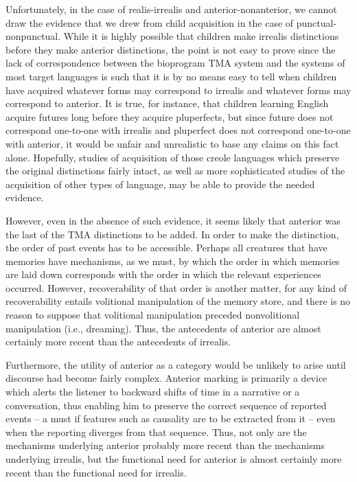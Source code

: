 Unfortunately, in the case of realis-irrealis and anterior-nonanterior, we cannot draw the evidence that we drew from child acquisition in the case of punctual-nonpunctual. While it is highly possible that children make irrealis distinctions before they make anterior distinctions, the point is not easy to prove since the lack of correspondence between the bioprogram TMA system and the systems of most target languages is such that it is by no means easy to tell when children have acquired whatever forms may correspond to irrealis and whatever forms may correspond to anterior. It is true, for instance, that children learning English acquire futures long before they acquire pluperfects, but since future does not correspond one-to-one with irrealis and pluperfect does not correspond one-to-one with anterior, it would be unfair and unrealistic to base any claims on this fact alone. Hopefully, studies of acquisition of those creole languages which preserve the original distinctions fairly intact, as well as more sophisticated studies of the acquisition of other types of language, may be able to provide the needed evidence.


However, even in the absence of such evidence, it seems likely that anterior was the last of the TMA distinctions to be added. In order to make the distinction, the order of past events has to be accessible. Perhaps all creatures that have memories have mechanisms, as we must, by which the order in which memories are laid down corresponds with the order in which the relevant experiences occurred. However, recoverability of that order is another matter, for any kind of recoverability entails volitional manipulation of the memory store, and there is no reason to suppose that volitional manipulation preceded nonvolitional manipulation (i.e., dreaming). Thus, the antecedents of anterior are almost certainly more recent than the antecedents of irrealis.

Furthermore, the utility of anterior as a category would be unlikely to arise until discourse had become fairly complex. Anterior marking is primarily a device which alerts the listener to backward shifts of time in a narrative or a conversation, thus enabling him to preserve the correct sequence of reported events -- a must if features such as causality are to be extracted from it -- even when the reporting diverges from that sequence. Thus, not only are the mechanisms under\-lying anterior probably more recent than the mechanisms underlying irrealis, but the functional need for anterior is almost certainly more recent than the functional need for irrealis.

